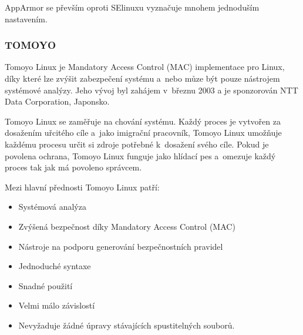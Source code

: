 \documentclass[a4paper,12pt]{article}
\begin{document}
AppArmor se převším oproti SElinuxu vyznačuje mnohem jednoduším nastavením.

\subsubsection{TOMOYO}
Tomoyo Linux je Mandatory Access Control (MAC) implementace pro Linux, díky které lze zvýšit zabezpečení systému a~nebo můze být pouze nástrojem systémové analýzy. Jeho vývoj byl zahájem v~březnu 2003 a je sponzorován NTT Data Corporation, Japonsko.

Tomoyo Linux se zaměřuje na chování systému. Každý proces je vytvořen za dosažením uřcitého cíle a~jako imigrační pracovník, Tomoyo Linux umožňuje každému procesu určit si zdroje potřebné k~dosažení svého cíle. Pokud je povolena ochrana, Tomoyo Linux funguje jako hlídací pes a~omezuje každý proces tak jak má povoleno správcem.\cite{TOMOYOLinuxHOME}

Mezi hlavní přednosti Tomoyo Linux patří:
\begin{itemize}
 \item Systémová analýza
 \item Zvýšená bezpečnost díky Mandatory Access Control (MAC)
 \item Nástroje na podporu generování bezpečnostních pravidel
 \item Jednoduché syntaxe
 \item Snadné použití
 \item Velmi málo závislostí
 \item Nevyžaduje žádné úpravy stávajících spustitelných souborů.
\end{itemize}

\end{document}
